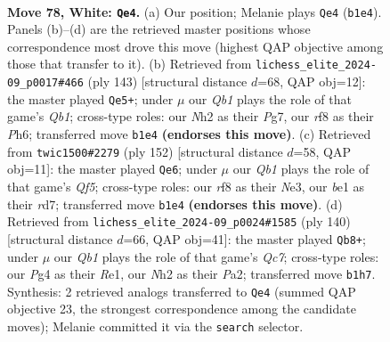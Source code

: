 \documentclass[11pt]{article}
\begin{document}
\clearpage

\begin{figure}[p]\centering
\begin{subfigure}{0.46\textwidth}\centering
\resizebox{\linewidth}{!}{%
\newchessgame
\chessboard[
  setfen={2k2r1r/p5p1/7p/7P/3P2P1/2q1P3/7N/1Q2b2K w - - 5 78},
  showmover=false,
  pgfstyle=straightmove, color=movearrow, markmove={b1-e4}
]}
\caption{}
\end{subfigure}\hfill
\begin{subfigure}{0.46\textwidth}\centering
\resizebox{\linewidth}{!}{%
\newchessgame
\chessboard[
  setfen={1q4k1/5pp1/2Q4p/2K5/p7/P5P1/1P3R1P/1b6 b - - 14 72},
  showmover=false,
  pgfstyle=straightmove, color=movearrow, markmove={b8-e5}
]}
\caption{}
\end{subfigure}
\\[4pt]
\begin{subfigure}{0.46\textwidth}\centering
\resizebox{\linewidth}{!}{%
\newchessgame
\chessboard[
  setfen={3r4/3rb1k1/1p6/p4Q2/P6P/1P2N1PK/8/8 w - - 5 77},
  showmover=false,
  pgfstyle=straightmove, color=movearrow, markmove={f5-e6}
]}
\caption{}
\end{subfigure}\hfill
\begin{subfigure}{0.46\textwidth}\centering
\resizebox{\linewidth}{!}{%
\newchessgame
\chessboard[
  setfen={7k/2Q5/1p1pP2q/8/4Pppr/8/PP3PK1/4R3 w - - 31 71},
  showmover=false,
  pgfstyle=straightmove, color=movearrow, markmove={c7-b8}
]}
\caption{}
\end{subfigure}
\caption{\textbf{Move 78, White: \texttt{Qe4}.} (a) Our position; Melanie plays \texttt{Qe4} (\texttt{b1e4}). Panels (b)--(d) are the retrieved master positions whose correspondence most drove this move (highest QAP objective among those that transfer to it). (b) Retrieved from \texttt{lichess\_elite\_2024-09\_p0017\#466} (ply 143) [structural distance $d$=68, QAP obj=12]: the master played \texttt{Qe5+}; under $\mu$ our \emph{Qb1} plays the role of that game's \emph{Qb1}; cross-type roles: our \emph{N}h2 as their \emph{P}g7, our \emph{r}f8 as their \emph{P}h6; transferred move \texttt{b1e4} \textbf{(endorses this move)}. (c) Retrieved from \texttt{twic1500\#2279} (ply 152) [structural distance $d$=58, QAP obj=11]: the master played \texttt{Qe6}; under $\mu$ our \emph{Qb1} plays the role of that game's \emph{Qf5}; cross-type roles: our \emph{r}f8 as their \emph{N}e3, our \emph{b}e1 as their \emph{r}d7; transferred move \texttt{b1e4} \textbf{(endorses this move)}. (d) Retrieved from \texttt{lichess\_elite\_2024-09\_p0024\#1585} (ply 140) [structural distance $d$=66, QAP obj=41]: the master played \texttt{Qb8+}; under $\mu$ our \emph{Qb1} plays the role of that game's \emph{Qc7}; cross-type roles: our \emph{P}g4 as their \emph{R}e1, our \emph{N}h2 as their \emph{P}a2; transferred move \texttt{b1h7}. Synthesis: 2 retrieved analogs transferred to \texttt{Qe4} (summed QAP objective 23, the strongest correspondence among the candidate moves); Melanie committed it via the \texttt{search} selector.}
\label{fig:thought-m154}
\end{figure}
\end{document}
